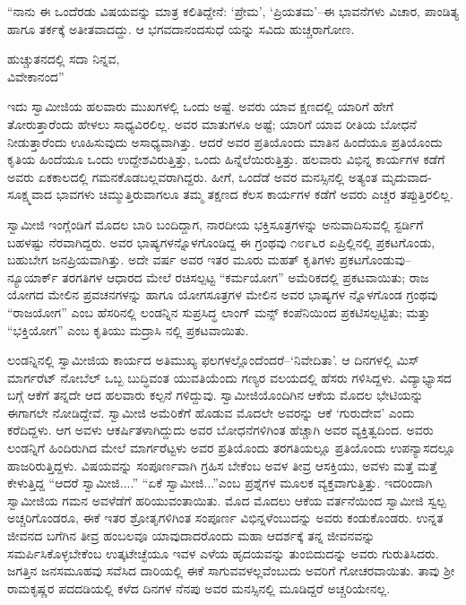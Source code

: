 “ನಾನು ಈ ಒಂದೆರಡು ವಿಷಯವನ್ನು ಮಾತ್ರ ಕಲಿತಿದ್ದೇನೆ: ‘ಪ್ರೇಮ’, ‘ಪ್ರಿಯತಮ’–ಈ ಭಾವನೆಗಳು ವಿಚಾರ, ಪಾಂಡಿತ್ಯ ಹಾಗೂ ತರ್ಕಕ್ಕೆ ಅತೀತವಾದದ್ದು. ಆ ಭಗವದಾನಂದಸುಧೆ ಯನ್ನು ಸವಿದು ಹುಚ್ಚರಾಗೋಣ.

\begin{flushright}
ಹುಚ್ಚುತನದಲ್ಲಿ ಸದಾ ನಿನ್ನವ,\\ವಿವೇಕಾನಂದ”
\end{flushright}

ಇದು ಸ್ವಾಮೀಜಿಯ ಹಲವಾರು ಮುಖಗಳಲ್ಲಿ ಒಂದು ಅಷ್ಟೆ. ಅವರು ಯಾವ ಕ್ಷಣದಲ್ಲಿ ಯಾರಿಗೆ ಹೇಗೆ ತೋರುತ್ತಾರೆಂದು ಹೇಳಲು ಸಾಧ್ಯವಿರಲಿಲ್ಲ. ಅವರ ಮಾತುಗಳೂ ಅಷ್ಟೆ; ಯಾರಿಗೆ ಯಾವ ರೀತಿಯ ಬೋಧನೆ ನೀಡುತ್ತಾರೆಂದು ಊಹಿಸುವುದು ಅಸಾಧ್ಯವಾಗಿತ್ತು. ಆದರೆ ಅವರ ಪ್ರತಿಯೊಂದು ಮಾತಿನ ಹಿಂದೆಯೂ ಪ್ರತಿಯೊಂದು ಕೃತಿಯ ಹಿಂದೆಯೂ ಒಂದು ಉದ್ದೇಶವಿರುತ್ತಿತ್ತು, ಒಂದು ಹಿನ್ನೆಲೆಯಿರುತ್ತಿತ್ತು. ಹಲವಾರು ವಿಭಿನ್ನ ಕಾರ್ಯಗಳ ಕಡೆಗೆ ಅವರು ಏಕಕಾಲದಲ್ಲಿ ಗಮನಕೊಡಬಲ್ಲವರಾಗಿದ್ದರು. ಹೀಗೆ, ಒಂದೆಡೆ ಅವರ ಮನಸ್ಸಿನಲ್ಲಿ ಅತ್ಯಂತ ಮೃದುವಾದ-ಸೂಕ್ಷ್ಮವಾದ ಭಾವಗಳು ಚಿಮ್ಮುತ್ತಿರುವಾಗಲೂ ತಮ್ಮ ತಕ್ಷಣದ ಕೆಲಸ ಕಾರ್ಯಗಳ ಕಡೆಗೆ ಅವರು ಎಚ್ಚರ ತಪ್ಪುತ್ತಿರಲಿಲ್ಲ.

ಸ್ವಾಮೀಜಿ ಇಂಗ್ಲೆಂಡಿಗೆ ಮೊದಲ ಬಾರಿ ಬಂದಿದ್ದಾಗ, ನಾರದೀಯ ಭಕ್ತಿಸೂತ್ರಗಳನ್ನು ಅನುವಾದಿಸುವಲ್ಲಿ ಸ್ಟರ್ಡಿಗೆ ಬಹಳಷ್ಟು ನೆರವಾಗಿದ್ದರು. ಅವರ ಭಾಷ್ಯಗಳನ್ನೊಳಗೊಂಡಿದ್ದ ಈ ಗ್ರಂಥವು ೧೮೯೬ರ ಏಪ್ರಿಲ್ಲಿನಲ್ಲಿ ಪ್ರಕಟಗೊಂಡು, ಬಹುಬೇಗ ಜನಪ್ರಿಯವಾಗಿತ್ತು. ಅದೇ ವರ್ಷ ಅವರ ಇತರ ಮೂರು ಮಹತ್ ಕೃತಿಗಳು ಪ್ರಕಟಗೊಂಡುವು–ನ್ಯೂಯಾರ್ಕ್ ತರಗತಿಗಳ ಆಧಾರದ ಮೇಲೆ ರಚಿಸಲ್ಪಟ್ಟ “ಕರ್ಮಯೋಗ” ಅಮೆರಿಕದಲ್ಲಿ ಪ್ರಕಟವಾಯಿತು; ರಾಜ ಯೋಗದ ಮೇಲಿನ ಪ್ರವಚನಗಳನ್ನು ಹಾಗೂ ಯೋಗಸೂತ್ರಗಳ ಮೇಲಿನ ಅವರ ಭಾಷ್ಯಗಳ ನ್ನೊಳಗೊಂಡ ಗ್ರಂಥವು “ರಾಜಯೋಗ” ಎಂಬ ಹೆಸರಿನಲ್ಲಿ ಲಂಡನ್ನಿನ ಸುಪ್ರಸಿದ್ಧ ಲಾಂಗ್ ಮನ್ಸ್ ಕಂಪೆನಿಯಿಂದ ಪ್ರಕಟಿಸಲ್ಪಟ್ಟಿತು; ಮತ್ತು “ಭಕ್ತಿಯೋಗ” ಎಂಬ ಕೃತಿಯು ಮದ್ರಾಸಿ ನಲ್ಲಿ ಪ್ರಕಟವಾಯಿತು.

ಲಂಡನ್ನಿನಲ್ಲಿ ಸ್ವಾಮೀಜಿಯ ಕಾರ್ಯದ ಅತಿಮುಖ್ಯ ಫಲಗಳಲ್ಲೊಂದೆಂದರೆ–‘ನಿವೇದಿತಾ’. ಆ ದಿನಗಳಲ್ಲಿ ಮಿಸ್ ಮಾರ್ಗರೆಟ್ ನೋಬೆಲ್ ಒಬ್ಬ ಬುದ್ಧಿವಂತ ಯುವತಿಯೆಂದು ಗಣ್ಯರ ವಲಯದಲ್ಲಿ ಹೆಸರು ಗಳಿಸಿದ್ದಳು. ವಿದ್ಯಾಭ್ಯಾಸದ ಬಗ್ಗೆ ಆಕೆಗೆ ತನ್ನದೇ ಆದ ಹಲವಾರು ಕಲ್ಪನೆ ಗಳಿದ್ದುವು. ಸ್ವಾಮೀಜಿಯೊಂದಿಗಿನ ಆಕೆಯ ಮೊದಲ ಭೇಟಿಯನ್ನು ಈಗಾಗಲೇ ನೋಡಿದ್ದೇವೆ. ಸ್ವಾಮೀಜಿ ಅಮೆರಿಕೆಗೆ ಹೊಡುವ ಮೊದಲೇ ಅವರನ್ನು ಆಕೆ ‘ಗುರುದೇವ’ ಎಂದು ಕರೆದಿದ್ದಳು. ಆಗ ಅವಳು ಆಕರ್ಷಿತಳಾಗಿದ್ದುದು ಅವರ ಬೋಧನೆಗಳಿಗಿಂತ ಹೆಚ್ಚಾಗಿ ಅವರ ವ್ಯಕ್ತಿತ್ವದಿಂದ. ಅವರು ಲಂಡನ್ನಿಗೆ ಹಿಂದಿರುಗಿದ ಮೇಲೆ ಮಾರ್ಗರೆಟ್ಟಳು ಅವರ ಪ್ರತಿಯೊಂದು ತರಗತಿಯಲ್ಲೂ ಪ್ರತಿಯೊಂದು ಉಪನ್ಯಾಸದಲ್ಲೂ ಹಾಜರಿರುತ್ತಿದ್ದಳು. ವಿಷಯವನ್ನು ಸಂಪೂರ್ಣವಾಗಿ ಗ್ರಹಿಸ ಬೇಕೆಂಬ ಅವಳ ತೀವ್ರ ಆಸಕ್ತಿಯು, ಅವಳು ಮತ್ತೆ ಮತ್ತೆ ಕೇಳುತ್ತಿದ್ದ “ಆದರೆ ಸ್ವಾಮೀಜಿ....” “ಏಕೆ ಸ್ವಾಮೀಜಿ...”ಎಂಬ ಪ್ರಶ್ನೆಗಳ ಮೂಲಕ ವ್ಯಕ್ತವಾಗುತ್ತಿತ್ತು. ಇದರಿಂದಾಗಿ ಸ್ವಾಮೀಜಿಯ ಗಮನ ಅವಳೆಡೆಗೆ ಹರಿಯುವಂತಾಯಿತು. ಮೊದ ಮೊದಲು ಆಕೆಯ ವರ್ತನೆಯಿಂದ ಸ್ವಾಮೀಜಿ ಸ್ವಲ್ಪ ಅಚ್ಚರಿಗೊಂಡರೂ, ಈಕೆ ಇತರ ಶ್ರೋತೃಗಳಿಗಿಂತ ಸಂಪೂರ್ಣ ವಿಭಿನ್ನಳೆಂಬುದನ್ನು ಅವರು ಕಂಡುಕೊಂಡರು. ಉನ್ನತ ಜೀವನದ ಬಗೆಗಿನ ತೀವ್ರ ಹಂಬಲವೂ ಯಾವುದಾದರೊಂದು ಮಹಾ ಆದರ್ಶಕ್ಕೆ ತನ್ನ ಜೀವನವನ್ನು ಸಮರ್ಪಿಸಿಕೊಳ್ಳಬೇಕೆಂಬ ಉತ್ಕಟೇಚ್ಛೆಯೂ ಇವಳ ಎಳೆಯ ಹೃದಯವನ್ನು ತುಂಬಿದುದನ್ನು ಅವರು ಗುರುತಿಸಿದರು. ಜಗತ್ತಿನ ಜನಸಮೂಹವು ಸವೆಸಿದ ದಾರಿಯಲ್ಲಿ ಈಕೆ ಸಾಗುವವಳಲ್ಲವೆಂಬುದು ಅವರಿಗೆ ಗೋಚರವಾಯಿತು. ತಾವು ಶ್ರೀ ರಾಮಕೃಷ್ಣರ ಪದದಡಿಯಲ್ಲಿ ಕಳೆದ ದಿನಗಳ ನೆನಪು ಅವರ ಮನಸ್ಸಿನಲ್ಲಿ ಮೂಡಿದ್ದರೆ ಅಚ್ಚರಿಯೇನಲ್ಲ.

